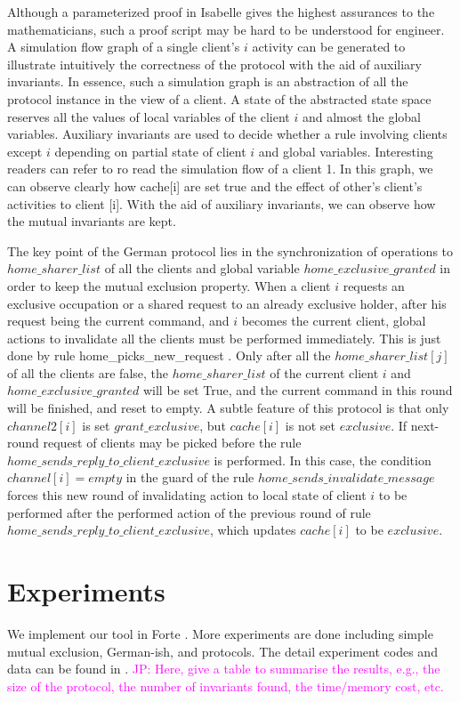 \documentclass{llncs}
\newcommand\JP[1]{\textcolor{magenta}{JP: #1}}
\begin{document}
Although a parameterized proof in Isabelle gives the highest
assurances to the mathematicians, such a proof script may be hard to
be understood for engineer. A simulation flow graph of a single
client's $i$ activity can be generated to illustrate intuitively the
correctness of the protocol with the aid of auxiliary invariants. In
essence, such a simulation graph is an abstraction of all the
protocol instance in the view of a client. A state of the abstracted
state space reserves all the values of local variables of the client
$i$ and almost the global variables. Auxiliary invariants are used
to decide whether a rule involving clients except $i$ depending on
partial state of client $i$ and global variables. Interesting
readers can refer to \cite{} ro read the simulation flow of a client
1. In this graph, we can observe clearly how cache[i] are set true
and the effect  of other's client's activities to client [i]. With
the aid of auxiliary invariants, we can observe how the mutual
invariants are kept.

The key point of the German protocol lies in the synchronization of
operations to $home\_sharer\_list$ of all the clients and global
variable $home\_exclusive\_granted$ in order to keep the mutual
exclusion property. When a client $i$ requests an exclusive
occupation or a shared request to an already exclusive holder, after
his request being the current command, and $i$ becomes the current
client,  global actions to invalidate all the clients must be
performed immediately. This is just done by rule {\sf
home\_picks\_new\_request} . Only after all the
$home\_sharer\_list[j]$ of all the clients are false, the
$home\_sharer\_list$ of the current client $i$ and
$home\_exclusive\_granted$ will be set True, and the current command
in this round will be finished, and reset to empty. A subtle feature
of this protocol is that only $channel2[i]$ is set
$grant\_exclusive$, but $cache[i]$ is not set $exclusive$. If
next-round request of clients may be picked before the rule
$home\_sends\_reply\_to\_client\_exclusive$ is performed. In this
case, the condition $channel[i]=empty$ in the guard of the rule
$home\_sends\_invalidate\_message$ forces this new round of
invalidating action to local state of client $i$ to be performed
after the performed action of the previous round of rule
$home\_sends\_reply\_to\_client\_exclusive$, which updates
$cache[i]$ to be $exclusive$.

\section{Experiments}
We implement our tool in Forte \cite{Forte}. More experiments are
done including simple mutual exclusion, German-ish, and  protocols.
The detail experiment codes and data can be found in \cite{}.
\JP{Here, give a table to summarise the results,
e.g., the size of the protocol, the number of invariants found,
the time/memory cost, etc.}
\end{document}
